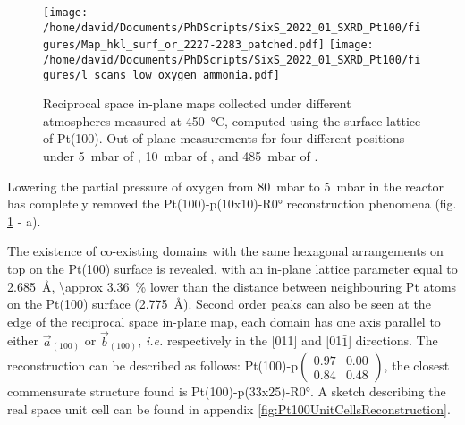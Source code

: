 \begin{figure}[!htb]
    \centering
    \texttt{[image: /home/david/Documents/PhDScripts/SixS\_2022\_01\_SXRD\_Pt100/figures/Map\_hkl\_surf\_or\_2227-2283\_patched.pdf]}
    \texttt{[image: /home/david/Documents/PhDScripts/SixS\_2022\_01\_SXRD\_Pt100/figures/l\_scans\_low\_oxygen\_ammonia.pdf]}
    \caption{
        Reciprocal space in-plane maps collected under different atmospheres measured at \qty{450}{\degreeCelsius}, computed using the surface lattice of Pt(100).
        Out-of plane measurements for four different positions under \qty{5}{\milli\bar} of , \qty{10}{\milli\bar} of , and \qty{485}{\milli\bar} of .
    }
    \label{fig:MapsAndLScansPt100LowOxAmmonia}
\end{figure}

Lowering the partial pressure of oxygen from \qty{80}{\milli\bar} to \qty{5}{\milli\bar} in the reactor has completely removed the Pt(100)-p(10x10)-R\ang{0} reconstruction phenomena (fig. \ref{fig:MapsAndLScansPt100LowOxAmmonia} - a).

The existence of co-existing domains with the same hexagonal arrangements on top on the Pt(100) surface is revealed, with an in-plane lattice parameter equal to \qty{2.685}{\angstrom}, \qty{\approx 3.36}{\percent} lower than the distance between neighbouring Pt atoms on the Pt(100) surface (\qty{2.775}{\angstrom}).
Second order peaks can also be seen at the edge of the reciprocal space in-plane map, each domain has one axis parallel to either $\vec{a}_{(100)}$ or $\vec{b}_{(100)}$, \textit{i.e.} respectively in the [011] and [01$\bar{1}$] directions.
The reconstruction can be described as follows: Pt(100)-p$\begin{pmatrix} 0.97 & 0.00\\ 0.84 & 0.48 \end{pmatrix}$, the closest commensurate structure found is Pt(100)-p(33x25)-R\ang{0}.
A sketch describing the real space unit cell can be found in appendix \ref{fig:Pt100UnitCellsReconstruction}.

